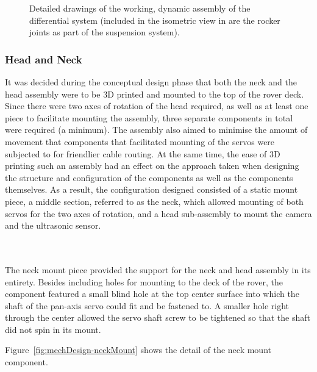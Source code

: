\begin{figure}[h!]
{        }
        \caption[Detailed drawings of the working, dynamic assembly of the differential system.]{Detailed drawings of the working, dynamic assembly of the differential system (included in the isometric view in \protect{} are the rocker joints as part of the suspension system).}
        \label{fig:mechDesign-differentialSubDetail}
        \end{figure}
        
              
    \subsubsection{Head and Neck}
      It was decided during the conceptual design phase that both the neck and the head assembly were to be 3D printed and mounted to the top of the rover deck. Since there were two axes of rotation of the head required, as well as at least one piece to facilitate mounting the assembly, three separate components in total were required (a minimum). The assembly also aimed to minimise the amount of movement that components that facilitated mounting of the servos were subjected to for friendlier cable routing. At the same time, the ease of 3D printing such an assembly had an effect on the approach taken when designing the structure and configuration of the components as well as the components themselves. As a result, the configuration designed consisted of a static mount piece, a middle section, referred to as the neck, which allowed mounting of both servos for the two axes of rotation, and a head sub-assembly to mount the camera and the ultrasonic sensor.
      
      \\\\
        The neck mount piece provided the support for the neck and head assembly in its entirety. Besides including holes for mounting to the deck of the rover, the component featured a small blind hole at the top center surface into which the shaft of the pan-axis servo could fit and be fastened to. A smaller hole right through the center allowed the servo shaft screw to be tightened so that the shaft did not spin in its mount.
        
        Figure~\ref{fig:mechDesign-neckMount} shows the detail of the neck mount component.

